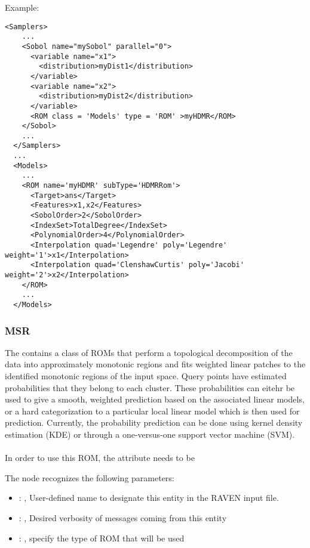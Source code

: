 \hspace{24pt}
Example:
\begin{lstlisting}[style=XML,morekeywords={name,subType}]
  <Samplers>
    ...
    <Sobol name="mySobol" parallel="0">
      <variable name="x1">
        <distribution>myDist1</distribution>
      </variable>
      <variable name="x2">
        <distribution>myDist2</distribution>
      </variable>
      <ROM class = 'Models' type = 'ROM' >myHDMR</ROM>
    </Sobol>
    ...
  </Samplers>
  ...
  <Models>
    ...
    <ROM name='myHDMR' subType='HDMRRom'>
      <Target>ans</Target>
      <Features>x1,x2</Features>
      <SobolOrder>2</SobolOrder>
      <IndexSet>TotalDegree</IndexSet>
      <PolynomialOrder>4</PolynomialOrder>
      <Interpolation quad='Legendre' poly='Legendre' weight='1'>x1</Interpolation>
      <Interpolation quad='ClenshawCurtis' poly='Jacobi' weight='2'>x2</Interpolation>
    </ROM>
    ...
  </Models>
\end{lstlisting}


\subsubsection{MSR}
  The  contains a class of ROMs that perform a topological
  decomposition of the data into approximately monotonic regions and fits weighted
  linear patches to the identified monotonic regions of the input space. Query
  points have estimated probabilities that they belong to each cluster. These
  probabilities can eitehr be used to give a smooth, weighted prediction based on
  the associated linear models, or a hard categorization  to a particular local
  linear model which is then used for prediction. Currently, the probability
  prediction can be done using kernel density estimation (KDE) or through a
  one-versus-one support vector machine (SVM).                             \\
                               \\                             In
  order to use this ROM, the  attribute  needs to
  be 

  The  node recognizes the following parameters:
    \begin{itemize}
      \item {}: ,
        User-defined name to designate this entity in the RAVEN input file.
      \item {}: ,
        Desired verbosity of messages coming from this entity
      \item {}: ,
        specify the type of ROM that will be used
  \end{itemize}

